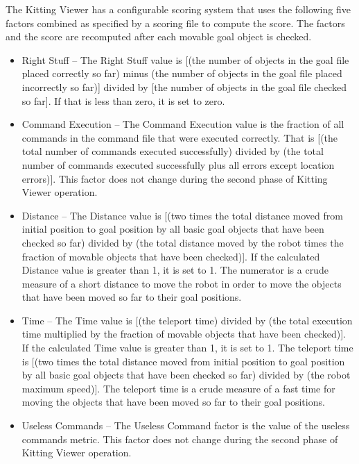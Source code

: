 The Kitting Viewer has a configurable scoring system that uses the
following five factors combined as specified by a scoring file to compute
the score. The factors and the score are recomputed after each movable goal
object is checked.

\begin{itemize}

\item \small \sf Right Stuff \rm \normalsize -- The Right Stuff value is
[(the number of objects in the goal file placed correctly so far) minus
(the number of objects in the goal file placed incorrectly so far)] divided
by [the number of objects in the goal file checked so far]. If that is less
than zero, it is set to zero.

\item \small \sf Command Execution \rm \normalsize -- The Command Execution
value is the fraction of all commands in the command file that were
executed correctly. That is [(the total number of commands executed
successfully) divided by (the total number of commands executed
successfully plus all errors except location errors)]. This factor does
not change during the second phase of Kitting Viewer operation.

\item \small \sf Distance \rm \normalsize -- The Distance value is [(two
times the total distance moved from initial position to goal position by
all basic goal objects that have been checked so far) divided by (the total
distance moved by the robot times the fraction of movable objects that have
been checked)]. If the calculated Distance value is greater than 1, it is
set to 1. The numerator is a crude measure of a short distance to move the
robot in order to move the objects that have been moved so far to their
goal positions.

\item \small \sf Time \rm \normalsize -- The Time value is [(the teleport
time) divided by (the total execution time multiplied by the fraction of
movable objects that have been checked)]. If the calculated Time value is
greater than 1, it is set to 1. The teleport time is [(two times the total
distance moved from initial position to goal position by all basic goal
objects that have been checked so far) divided by (the robot maximum
speed)]. The teleport time is a crude measure of a fast time for moving the
objects that have been moved so far to their goal positions.

\item \small \sf Useless Commands \rm \normalsize -- The Useless Command
factor is the value of the useless commands metric. This factor does
not change during the second phase of Kitting Viewer operation.

\end{itemize}

